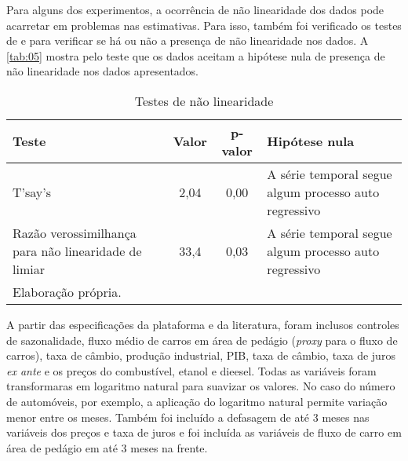 \documentclass[
article, %
12pt, %
oneside, %
a4paper, %
portuguese, %
portuguese %
]{abntex2}
\begin{document}
Para alguns dos experimentos, a ocorrência de não linearidade dos dados pode acarretar em problemas nas estimativas. Para isso, também foi verificado os testes de  e  para verificar se há ou não a presença de não linearidade nos dados. A \autoref{tab:05} mostra pelo teste que os dados aceitam a hipótese nula de presença de não linearidade nos dados apresentados.

\begin{table}[H] 
  \centering
  \caption{Testes de não linearidade}
    \begin{tabular}{l|ccl}
    \hline
    Teste & Valor & p-valor & Hipótese nula  \\
    \hline
    T'say's & 2,04  & 0,00 & \multicolumn{1}{m{15em}}{A série temporal segue algum processo auto regressivo}  \\
    \multicolumn{1}{m{15em}|}{Razão verossimilhança para não linearidade de limiar} & 33,4 & 0,03 &  \multicolumn{1}{m{15em}}{A série temporal segue algum processo auto regressivo} \\
    \hline
    \multicolumn{3}{l}{Elaboração própria.}
    \end{tabular}%
  \label{tab:05}%
\end{table}%


A partir das especificações da plataforma e da literatura, foram inclusos controles de sazonalidade, fluxo médio de carros em área de pedágio (\textit{proxy} para o fluxo de carros), taxa de câmbio, produção industrial, PIB, taxa de câmbio, taxa de juros \textit{ex ante} e os preços do combustível, etanol e dieesel. Todas as variáveis foram transformaras em logaritmo natural para suavizar os valores. No caso do número de automóveis, por exemplo, a aplicação do logaritmo natural permite variação menor entre os meses. Também foi incluído a defasagem de até 3 meses nas variáveis dos preços e taxa de juros e foi incluída as variáveis de fluxo de carro em área de pedágio em até 3 meses na frente.
\end{document}
